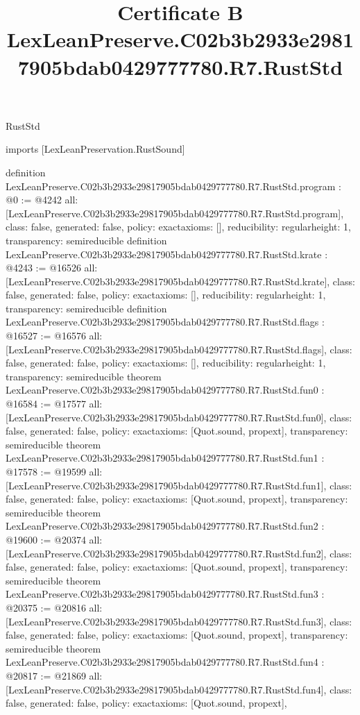\begin{lexlean}{RustStd}
\title{Certificate B LexLeanPreserve.C02b3b2933e29817905bdab0429777780.R7.RustStd}
\begin{coremodule}
imports [LexLeanPreservation.RustSound]

definition LexLeanPreserve.C02b3b2933e29817905bdab0429777780.R7.RustStd.program : @0 := @4242 {
  all: [LexLeanPreserve.C02b3b2933e29817905bdab0429777780.R7.RustStd.program],
  class: false,
  generated: false,
  policy: exact{axioms: []},
  reducibility: regular{height: 1},
  transparency: semireducible
}
definition LexLeanPreserve.C02b3b2933e29817905bdab0429777780.R7.RustStd.krate : @4243 := @16526 {
  all: [LexLeanPreserve.C02b3b2933e29817905bdab0429777780.R7.RustStd.krate],
  class: false,
  generated: false,
  policy: exact{axioms: []},
  reducibility: regular{height: 1},
  transparency: semireducible
}
definition LexLeanPreserve.C02b3b2933e29817905bdab0429777780.R7.RustStd.flags : @16527 := @16576 {
  all: [LexLeanPreserve.C02b3b2933e29817905bdab0429777780.R7.RustStd.flags],
  class: false,
  generated: false,
  policy: exact{axioms: []},
  reducibility: regular{height: 1},
  transparency: semireducible
}
theorem LexLeanPreserve.C02b3b2933e29817905bdab0429777780.R7.RustStd.fun0 : @16584 := @17577 {
  all: [LexLeanPreserve.C02b3b2933e29817905bdab0429777780.R7.RustStd.fun0],
  class: false,
  generated: false,
  policy: exact{axioms: [Quot.sound, propext]},
  transparency: semireducible
}
theorem LexLeanPreserve.C02b3b2933e29817905bdab0429777780.R7.RustStd.fun1 : @17578 := @19599 {
  all: [LexLeanPreserve.C02b3b2933e29817905bdab0429777780.R7.RustStd.fun1],
  class: false,
  generated: false,
  policy: exact{axioms: [Quot.sound, propext]},
  transparency: semireducible
}
theorem LexLeanPreserve.C02b3b2933e29817905bdab0429777780.R7.RustStd.fun2 : @19600 := @20374 {
  all: [LexLeanPreserve.C02b3b2933e29817905bdab0429777780.R7.RustStd.fun2],
  class: false,
  generated: false,
  policy: exact{axioms: [Quot.sound, propext]},
  transparency: semireducible
}
theorem LexLeanPreserve.C02b3b2933e29817905bdab0429777780.R7.RustStd.fun3 : @20375 := @20816 {
  all: [LexLeanPreserve.C02b3b2933e29817905bdab0429777780.R7.RustStd.fun3],
  class: false,
  generated: false,
  policy: exact{axioms: [Quot.sound, propext]},
  transparency: semireducible
}
theorem LexLeanPreserve.C02b3b2933e29817905bdab0429777780.R7.RustStd.fun4 : @20817 := @21869 {
  all: [LexLeanPreserve.C02b3b2933e29817905bdab0429777780.R7.RustStd.fun4],
  class: false,
  generated: false,
  policy: exact{axioms: [Quot.sound, propext]},
}
\end{coremodule}
\end{lexlean}
